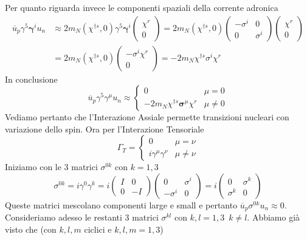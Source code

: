 Per quanto riguarda invece le componenti spaziali della corrente adronica
\begin{align*}
\overline{u}_p \gamma^5 \boldsymbol{\gamma}^i u_n &\approx 2m_N (\chi^{\dagger s}, 0) \gamma^5 \boldsymbol{\gamma}^i \begin{pmatrix} \chi^r \\ 0 \end{pmatrix} = 2m_N (\chi^{\dagger s}, 0) \begin{pmatrix} -\sigma^i & 0 \\ 0 & \sigma^i \end{pmatrix} \begin{pmatrix} \chi^r \\ 0 \end{pmatrix} \\
&= 2m_N (\chi^{\dagger s}, 0) \begin{pmatrix} -{\sigma}^i \chi^r \\ 0 \end{pmatrix} = -2m_N \chi^{\dagger s} \sigma^i \chi^r
\end{align*}
In conclusione
$$
\overline{u}_p \gamma^5 \gamma^\mu u_n \approx \begin{cases} 0 & \mu = 0 \\ -2m_N \chi^{\dagger s} \boldsymbol{\sigma}^\mu \chi^r & \mu \neq 0 \end{cases}
$$
Vediamo pertanto che l'Interazione Assiale permette transizioni nucleari con variazione dello spin. Ora per l'Interazione Tensoriale
$$
\Gamma_T = \begin{cases} 0 & \mu = \nu \\ i\gamma^\mu\gamma^\nu & \mu \neq \nu \end{cases}
$$
Iniziamo con le $3$ matrici $\sigma^{0k}$ con $k=1,3$
$$
\sigma^{0k} = i\gamma^0\gamma^k = i \begin{pmatrix} I & 0 \\ 0 & -I \end{pmatrix} \begin{pmatrix} 0 & {\sigma}^i \\ -{\sigma}^i & 0 \end{pmatrix} = i \begin{pmatrix} 0 & {\sigma}^k \\ {\sigma}^k & 0 \end{pmatrix}
$$
Queste matrici mescolano componenti large e small e pertanto $\overline{u}_p\sigma^{0k}u_n\approx0$. Consideriamo adesso le restanti $3$ matrici $\sigma^{kl}$ con $k,l=1,3\,\,\,k\not=l$. Abbiamo già visto che (con $k,l,m$ ciclici e $k,l,m=1,3$)
